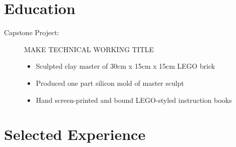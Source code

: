 \documentclass[a4paper]{deedy-resume} %
\begin{document}
    
    
    
    
    
    \section{Education}
    

    \begin{description}
        \item[Capstone Project:] MAKE TECHNICAL WORKING TITLE
        \begin{itemize}
            \item Sculpted clay master of 30cm x 15cm x 15cm LEGO brick
            \item Produced one part silicon mold of master sculpt
            \item Hand screen-printed and bound LEGO-styled instruction books
        \end{itemize}
    \end{description}
    
    \sectionspace %


    \section{Selected Experience}
\end{document}
